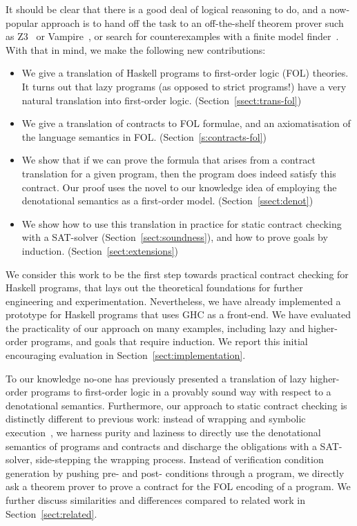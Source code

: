 It should be clear that there is a good deal of logical reasoning to do,
and a now-popular approach is to hand off the task to an off-the-shelf theorem
prover such as Z3~\cite{z3citation} or Vampire~\cite{vampire}, or search for 
counterexamples with a finite model finder~\cite{paradox}.
With that in mind, we make the following new contributions:

\begin{itemize}
  \item We give a translation of Haskell programs to first-order logic (FOL) theories. 
        It turns out that lazy programs (as opposed to
        strict programs!) have a very natural translation into first-order logic.
        (Section~\ref{ssect:trans-fol}) 
  \item We give a translation of contracts to FOL formulae, and an axiomatisation of 
        the language semantics in FOL. 
        (Section~\ref{s:contracts-fol})
  \item We show that if we can prove the formula that arises from a contract translation 
        for a given program, then the program does indeed satisfy this contract. Our proof
        uses the novel to our knowledge idea of employing the denotational 
        semantics as a first-order model. (Section~\ref{ssect:denot})
  \item We show how to use this translation in practice for static contract checking with
        a SAT-solver (Section~\ref{sect:soundness}), 
        and how to prove goals by induction. (Section~\ref{sect:extensions})
\end{itemize}

We consider this work to be the first step towards practical contract checking 
for Haskell programs, that lays out the theoretical foundations for further engineering 
and experimentation. Nevertheless, we have already implemented a prototype for Haskell 
programs that uses GHC as a front-end. We have evaluated the practicality of our approach 
on many examples, including lazy and higher-order programs, and goals that require 
induction. We report this initial encouraging evaluation in 
Section~\ref{sect:implementation}. 

To our knowledge no-one has previously presented a translation of lazy higher-order programs to 
first-order logic in a provably sound way with respect to a denotational
semantics. Furthermore, our approach to static contract checking is 
distinctly different to previous work: instead of wrapping and 
symbolic execution~\cite{xu+:contracts,Xu:2012:HCC:2103746.2103767}, 
we harness purity and laziness to directly use the denotational semantics
of programs and contracts and discharge the obligations with a SAT-solver, side-stepping
the wrapping process. Instead of verification condition generation by pushing
pre- and post- conditions through a program, we directly ask a theorem prover to prove 
a contract for the FOL encoding of a program. 
We further discuss similarities and differences compared to related work in Section~\ref{sect:related}.

